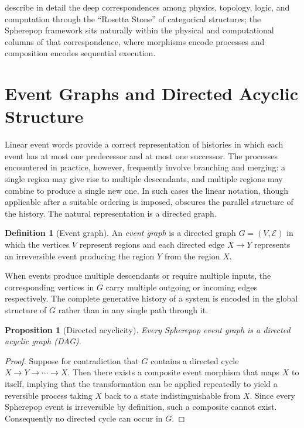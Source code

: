 \documentclass[12pt]{article}
\theoremstyle{plain}
\newtheorem{proposition}[theorem]{Proposition}
\theoremstyle{definition}
\newtheorem{definition}[theorem]{Definition}
\theoremstyle{remark}
\begin{document}
\citet{BaezStay2010} describe in detail the deep correspondences among physics,
topology, logic, and computation through the ``Rosetta Stone'' of categorical
structures; the Spherepop framework sits naturally within the physical and
computational columns of that correspondence, where morphisms encode processes
and composition encodes sequential execution.


\section{Event Graphs and Directed Acyclic Structure}
\label{sec:dags}

Linear event words provide a correct representation of histories in which each
event has at most one predecessor and at most one successor.  The processes
encountered in practice, however, frequently involve branching and merging: a
single region may give rise to multiple descendants, and multiple regions may
combine to produce a single new one.  In such cases the linear notation,
though applicable after a suitable ordering is imposed, obscures the parallel
structure of the history.  The natural representation is a directed graph.

\begin{definition}[Event graph]
An \emph{event graph} is a directed graph $G = (V, \mathcal{E})$ in which the
vertices $V$ represent regions and each directed edge $X \rightarrow Y$
represents an irreversible event producing the region $Y$ from the region $X$.
\end{definition}

When events produce multiple descendants or require multiple inputs, the
corresponding vertices in $G$ carry multiple outgoing or incoming edges
respectively.  The complete generative history of a system is encoded in the
global structure of $G$ rather than in any single path through it.

\begin{proposition}[Directed acyclicity]
Every Spherepop event graph is a directed acyclic graph (DAG).
\end{proposition}

\begin{proof}
Suppose for contradiction that $G$ contains a directed cycle
$X \rightarrow Y \rightarrow \cdots \rightarrow X$.  Then there exists a
composite event morphism that maps $X$ to itself, implying that the
transformation can be applied repeatedly to yield a reversible process
taking $X$ back to a state indistinguishable from $X$.  Since every
Spherepop event is irreversible by definition, such a composite cannot exist.
Consequently no directed cycle can occur in $G$.
\end{proof}
\end{document}
